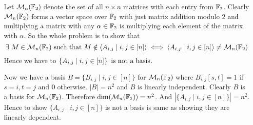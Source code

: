 \documentclass[a4paper, 11pt]{article}
\begin{document}
{Let $\mathcal{M}_n(\mathbb{F}_2)$ denote the set of all $n\times n$ matrices with each entry from $\mathbb{F}_2$. Clearly $\mathcal{M}_n(\mathbb{F}_2)$ forms a vector space over $\mathbb{F}_2$ with just matrix addition modulo $2$ and multiplying a matrix with any $\alpha\in\mathbb{F}_2$ is multiplying each element of the matrix with $\alpha$. So the whole problem is to show that $$\exs\ M\in\mcM_n(\bbF_2)\text{ such that }M\notin \lt\la A_{i,j}\mid i,j\in[n]\rt\ra\iff \lt\la A_{i,j}\mid i,j\in[n]\rt\ra\neq \mcM_n(\bbF_2)$$Hence we have to $\left\{ A_{i,j}\mid i,j\in[n]\right\}\text{ is not a basis}$. 

Now we have a basis $B=\{B_{i,j}\mid i,j\in[n]\}$ for $\mathcal{M}_n(\mathbb{F}_2)$ where $B_{i,j}[s,t]=1$ if $s=i,t=j$ and $0$ otherwise. $|B|=n^2$ and $B$ is linearly independent. Clearly $B$ is a basis for $\mathcal{M}_n(\mathbb{F}_2)$. Therefore $\dim(\mathcal{M}_n(\mathbb{F}_2))=n^2$. And $|\{A_{i,j}\mid i,j\in[n]\}|=n^2$. Hence to show $\{A_{i,j}\mid i,j\in[n]\}$ is not a basis is same as showing they are linearly dependent. 

}
\end{document}

